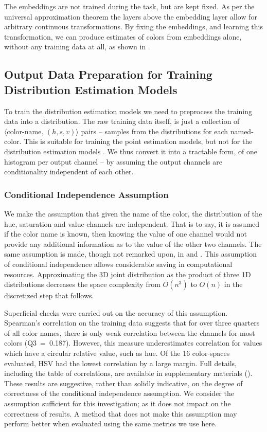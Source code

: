 \documentclass[]{book}
\newcommand{\parencite}{\citep}
\newcommand{\textcite}{\citet}
\newcommand{\datapairs}{$\langle\text{color-name},\,(h,s,v)\rangle$}
\begin{document}
The embeddings are not trained during the task, but are kept fixed.
As per the universal approximation theorem \parencite{leshno1993uat, SONODA2017uat} the layers above the embedding layer allow for arbitrary continuous transformations.
By fixing the embeddings, and learning this transformation,
we can produce estimates of colors from embeddings alone, without any training data at all, as shown in .

\subsection{Output Data Preparation for Training Distribution Estimation Models}\label{sec:output-data-preparation}
To train the distribution estimation models we need to preprocess the training data into a distribution.
The raw training data itself, is just a collection of 
 \datapairs{} pairs -- samples from the distributions for each named-color.
This is suitable for training the point estimation models, but not for the distribution estimation models .
We thus convert it into a tractable form, of one histogram per output channel -- by assuming the output channels are conditionality independent of each other.


\subsubsection{Conditional Independence Assumption} \label{sec:conditional-independence-assumption}
We make the assumption that given the name of the color, the distribution of the hue, saturation and value channels are independent.
That is to say, it is assumed if the color name is known, then  knowing the value of one channel would not provide any additional information as to the value of the other two channels.
The same assumption is made, though not remarked upon, in \textcite{meomcmahanstone:color} and \textcite{mcmahan2015bayesian}.
This assumption of conditional independence allows considerable saving in computational resources.
Approximating the 3D joint distribution as the product of three 1D distributions decreases the space complexity from $O(n^3)$ to $O(n)$ in the discretized step that follows.

Superficial checks were carried out on the accuracy of this assumption.
Spearman's correlation on the training data suggests that for over three quarters of all color names, there is only weak correlation between the channels for most colors (\mbox{Q3 = 0.187}).
However, this measure underestimates correlation for values which have a circular relative value, such as hue.
Of the 16 color-spaces evaluated, HSV had the lowest correlation by a large margin.
Full details, including the table of correlations, are available in supplementary materials ().
These results are suggestive, rather than solidly indicative, on the degree of correctness of the conditional independence assumption.
We consider the assumption sufficient for this investigation; as it does not impact on the correctness of results.
A method that does not make this assumption may perform better when evaluated using the same metrics we use here.
\end{document}
